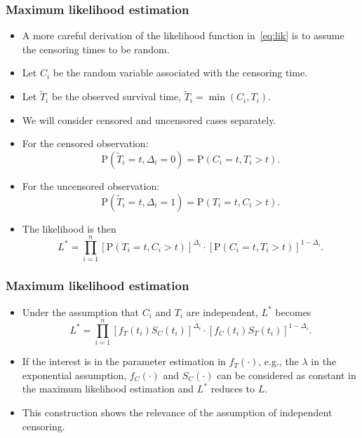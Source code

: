 \documentclass[10pt]{beamer}\usepackage[]{graphicx}\usepackage[]{color}
\newcommand{\p}{\mathrm{P}}
\begin{document}
\begin{frame}
  \frametitle{Maximum likelihood estimation}
  \begin{itemize}
  \item 
    A more careful derivation of the likelihood function in~\eqref{eq:lik} is to assume
    the censoring times to be random.
  \item Let $C_i$ be the random variable associated with the censoring time. 
  \item Let $\tilde{T}_i$ be the observed survival time, $\tilde{T}_i = \min(C_i, T_i)$.
  \item We will consider censored and uncensored cases separately.
  \item For the censored observation: 
    $$\p(\tilde{T}_i = t, \Delta_i = 0) = \p(C_i = t, T_i > t).$$ %
  \item For the uncensored observation: 
    $$\p(\tilde{T}_i = t, \Delta_i = 1) = \p(T_i = t, C_i > t).$$
  \item The likelihood is then
    \begin{equation*}
      L^* = \prod_{i = 1}^n\left[\p(T_i = t, C_i > t)\right]^{\Delta_i}\cdot\left[\p(C_i = t, T_i > t)\right]^{1 - \Delta_i}.
    \end{equation*}
  \end{itemize}
\end{frame}

\begin{frame}
  \frametitle{Maximum likelihood estimation}
  \begin{itemize}
  \item Under the assumption that $C_i$ and $T_i$ are independent, $L^*$ becomes
    \begin{equation*}
      L^* = \prod_{i = 1}^n\left[f_T(t_i)S_C(t_i)\right]^{\Delta_i}\cdot\left[f_C(t_i)S_T(t_i)\right]^{1 - \Delta_i}.
    \end{equation*}
  \item If the interest is in the parameter estimation in $f_T(\cdot)$, e.g., the $\lambda$ in the exponential assumption,
    $f_C(\cdot)$ and $S_C(\cdot)$ can be considered as constant in the maximum likelihood estimation and $L^*$ reduces to $L$.
  \item This construction shows the relevance of the assumption of independent censoring.
  \end{itemize}  
\end{frame}
\end{document}
